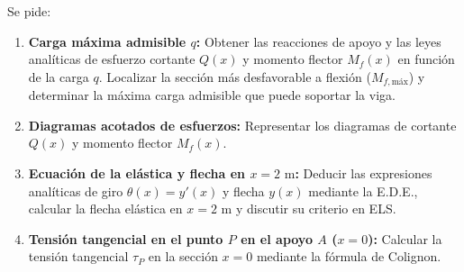 Se pide:
\begin{enumerate}[label=\alph*)]
    \item \textbf{Carga máxima admisible $q$:} Obtener las reacciones de apoyo y las leyes analíticas de esfuerzo cortante $Q(x)$ y momento flector $M_f(x)$ en función de la carga $q$. Localizar la sección más desfavorable a flexión ($M_{f,\text{máx}}$) y determinar la máxima carga admisible que puede soportar la viga.
    \item \textbf{Diagramas acotados de esfuerzos:} Representar los diagramas de cortante $Q(x)$ y momento flector $M_f(x)$.
    \item \textbf{Ecuación de la elástica y flecha en $x = 2\text{ m}$:} Deducir las expresiones analíticas de giro $\theta(x) = y'(x)$ y flecha $y(x)$ mediante la E.D.E., calcular la flecha elástica en $x = 2\text{ m}$ y discutir su criterio en ELS.
    \item \textbf{Tensión tangencial en el punto $P$ en el apoyo $A$ ($x = 0$):} Calcular la tensión tangencial $\tau_P$ en la sección $x = 0$ mediante la fórmula de Colignon.
\end{enumerate}

